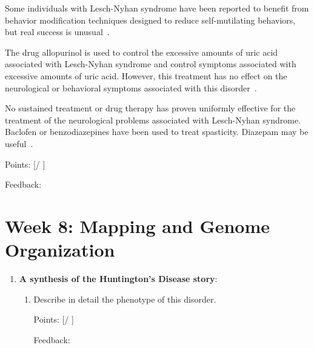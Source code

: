 \documentclass[plain,basic]{inVerba-notes}
\begin{document}
{\begin{enumerate}
\begin{enumerate}
{      Some individuals with Lesch-Nyhan syndrome have been reported to benefit from behavior modification techniques designed to reduce self-mutilating behaviors, but real success is unusual~\cite{nord2}.

      The drug allopurinol is used to control the excessive amounts of uric acid associated with Lesch-Nyhan syndrome and control symptoms associated with excessive amounts of uric acid. However, this treatment has no effect on the neurological or behavioral symptoms associated with this disorder~\cite{nord2}.

      No sustained treatment or drug therapy has proven uniformly effective for the treatment of the neurological problems associated with Lesch-Nyhan syndrome. Baclofen or benzodiazepines have been used to treat spasticity. Diazepam may be useful~\cite{nord2}.
    }

    Points: [\qquad / \qquad ]

    Feedback: 

    \vspace*{50pt}
  \end{enumerate}

\end{enumerate}
  
\newpage
\section{Week 8: Mapping and Genome Organization}

\begin{enumerate}
  \item \textbf{A synthesis of the Huntington’s Disease story}:
  
  \begin{enumerate}
    \item  Describe in detail the phenotype of this disorder.
    

    Points: [\qquad / \qquad ]

    Feedback: 


\end{enumerate}
\end{enumerate}}
\end{document}
